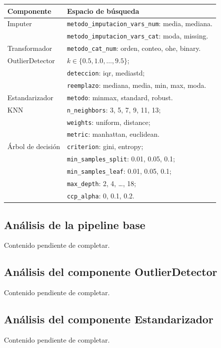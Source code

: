 \documentclass[12pt]{article}
\begin{document}
\begin{longtable}{p{} p{}}
\toprule
Componente & Espacio de búsqueda \\
\midrule
Imputer & \texttt{metodo\_imputacion\_vars\_num}: media, mediana.\\
& \texttt{metodo\_imputacion\_vars\_cat}: moda, missing. \\
\addlinespace
Transformador & \texttt{metodo\_cat\_num}: orden, conteo, ohe, binary. \\
\addlinespace
OutlierDetector & $k \in \{0.5, 1.0, \ldots, 9.5\}$; \\ & \texttt{deteccion}: iqr, mediastd; \\ & \texttt{reemplazo}: mediana, media, min, max, moda. \\
\addlinespace
Estandarizador & \texttt{metodo}: minmax, standard, robust. \\
\addlinespace
KNN & \texttt{n\_neighbors}: 3, 5, 7, 9, 11, 13; \\ & \texttt{weights}: uniform, distance; \\ & \texttt{metric}: manhattan, euclidean. \\
\addlinespace
Árbol de decisión & \texttt{criterion}: gini, entropy; \\ & \texttt{min\_samples\_split}: 0.01, 0.05, 0.1; \\ & \texttt{min\_samples\_leaf}: 0.01, 0.05, 0.1; \\ & \texttt{max\_depth}: 2, 4, \ldots, 18; \\ & \texttt{ccp\_alpha}: 0, 0.1, 0.2. \\
\bottomrule
\end{longtable}

\subsection{Análisis de la pipeline base}
Contenido pendiente de completar.

\subsection{Análisis del componente OutlierDetector}
Contenido pendiente de completar.

\subsection{Análisis del componente Estandarizador}
Contenido pendiente de completar.
\end{document}
